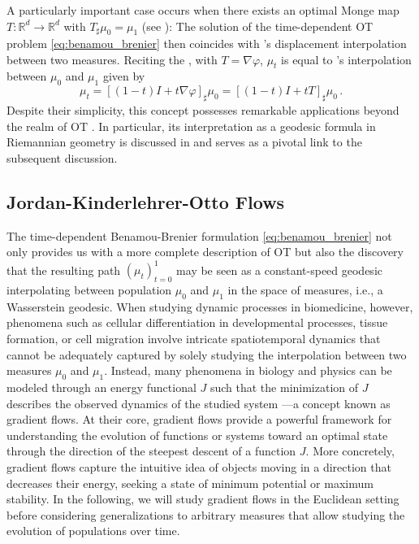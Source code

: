 A particularly important case occurs when there exists an optimal Monge map $T: \mathbb{R}^d \rightarrow \mathbb{R}^d$ with $T_\sharp \mu_0 = \mu_1$ (see ): The solution of the time-dependent \acrshort{OT} problem \eqref{eq:benamou_brenier} then coincides with \citeauthor{mccann1997convexity}'s displacement interpolation between two measures.
Reciting the , with $T = \nabla \varphi$, $\mu_t$ is equal to \citeauthor{mccann1997convexity}'s interpolation between $\mu_0$ and $\mu_1$ given by
\begin{equation} \label{eq:mccann_interpolation}
	\mu_t = [(1-t) I+t \nabla \varphi]_\sharp \mu_0 = [(1-t) I+t T]_\sharp \mu_0\,.
\end{equation}
Despite their simplicity, this concept possesses remarkable applications beyond the realm of \acrlong{OT} \citep{bonneel2011displacement}. In particular, its interpretation as a geodesic formula in Riemannian geometry is  discussed in \citet{otto2001geometry} and serves as a pivotal link to the subsequent discussion.


\subsection{Jordan-Kinderlehrer-Otto Flows} \label{sec:background_jko}

The time-dependent Benamou-Brenier formulation \eqref{eq:benamou_brenier} not only provides us with a more complete description of \acrlong{OT} but also the discovery that the resulting path $(\mu_t)_{t=0}^1$ may be seen as a constant-speed geodesic interpolating between population $\mu_0$ and $\mu_1$ in the space of measures, i.e., a Wasserstein geodesic.
When studying dynamic processes in biomedicine, however, phenomena such as cellular differentiation in developmental processes, tissue formation, or cell migration involve intricate spatiotemporal dynamics that cannot be adequately captured by solely studying the interpolation between two measures $\mu_0$ and $\mu_1$.
Instead, many phenomena in biology and physics can be modeled through an energy functional $J$ such that the minimization of $J$ describes the observed dynamics of the studied system ---a concept known as gradient flows.
At their core, gradient flows provide a powerful framework for understanding the evolution of functions or systems toward an optimal state through the direction of the steepest descent of a function $J$. 
More concretely, gradient flows capture the intuitive idea of objects moving in a direction that decreases their energy, seeking a state of minimum potential or maximum stability. 
In the following, we will study gradient flows in the Euclidean setting before considering generalizations to arbitrary measures that allow studying the evolution of populations over time.

